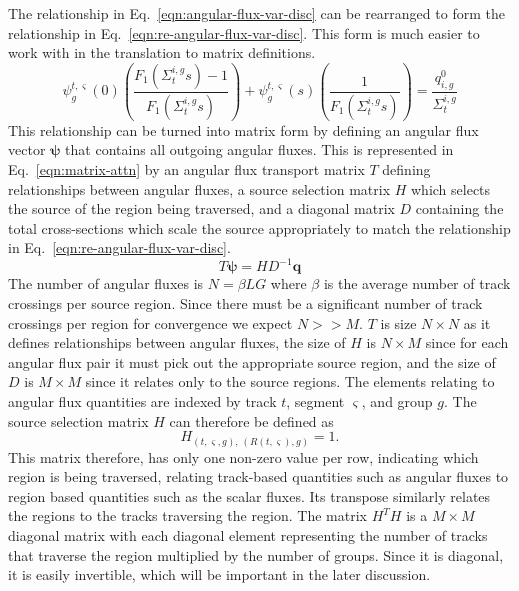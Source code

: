 The relationship in Eq.~\ref{eqn:angular-flux-var-disc} can be rearranged to form the relationship in Eq.~\ref{eqn:re-angular-flux-var-disc}. This form is much easier to work with in the translation to matrix definitions.
\begin{equation}
 \psi^{t,\varsigma}_g(0) \left(\frac{F_1\left(\Sigma_{t}^{i,g} s \right) - 1}{F_1\left(\Sigma_{t}^{i,g} s \right)}\right) + \psi_g^{t,\varsigma}(s) \left(\frac{1}{F_1\left(\Sigma_{t}^{i,g} s \right)}\right) = \frac{q^0_{i,g}}{\Sigma_{t}^{i,g}}
\label{eqn:re-angular-flux-var-disc}
\end{equation}
This relationship can be turned into matrix form by defining an angular flux vector $\boldsymbol{\psi}$ that contains all outgoing angular fluxes. This is represented in Eq.~\ref{eqn:matrix-attn} by an angular flux transport matrix $T$ defining relationships between angular fluxes, a source selection matrix $H$ which selects the source of the region being traversed, and a diagonal matrix $D$ containing the total cross-sections which scale the source appropriately to match the relationship in Eq.~\ref{eqn:re-angular-flux-var-disc}.
\begin{equation}
T \boldsymbol{\psi} = H D^{-1} \mathbf{q}
\label{eqn:matrix-attn}
\end{equation}
The number of angular fluxes is $N = \beta L G$ where $\beta$ is the average number of track crossings per source region. Since there must be a significant number of track crossings per region for convergence we expect $N >> M$. $T$ is size $N \times N$ as it defines relationships between angular fluxes, the size of $H$ is $N \times M$ since for each angular flux pair it must pick out the appropriate source region, and the size of $D$ is $M \times M$ since it relates only to the source regions. The elements relating to angular flux quantities are indexed by track $t$, segment $\varsigma$, and group $g$. The source selection matrix $H$ can therefore be defined as
\begin{equation}
H_{\left(t,\varsigma,g\right), \, \left(R(t,\varsigma), g\right)} = 1.
\label{eqn:source-selection-matrix}
\end{equation}
This matrix therefore, has only one non-zero value per row, indicating which region is being traversed, relating track-based quantities such as angular fluxes to region based quantities such as the scalar fluxes. Its transpose similarly relates the regions to the tracks traversing the region. The matrix $H^T H$ is a $M \times M$ diagonal matrix with each diagonal element representing the number of tracks that traverse the region multiplied by the number of groups. Since it is diagonal, it is easily invertible, which will be important in the later discussion.

